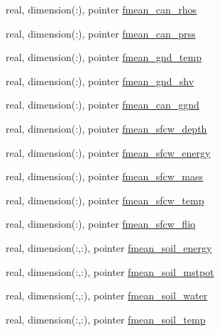 \begin{DoxyCompactItemize}
\item 
real, dimension(\+:), pointer \hyperlink{structed__state__vars_1_1sitetype_a133fcb8bbce4b0f845ba1731530c3083}{fmean\+\_\+can\+\_\+rhos}
\item 
real, dimension(\+:), pointer \hyperlink{structed__state__vars_1_1sitetype_ae1fd1be4d5db52eed0e9ccb9f2f5f03d}{fmean\+\_\+can\+\_\+prss}
\item 
real, dimension(\+:), pointer \hyperlink{structed__state__vars_1_1sitetype_a0edf09585748a9cac92aadeac17fe8c7}{fmean\+\_\+gnd\+\_\+temp}
\item 
real, dimension(\+:), pointer \hyperlink{structed__state__vars_1_1sitetype_ac4638175b3f7499b39d2fd6781d524d4}{fmean\+\_\+gnd\+\_\+shv}
\item 
real, dimension(\+:), pointer \hyperlink{structed__state__vars_1_1sitetype_ac22262ffe3410adfedbf9d40f9b4be97}{fmean\+\_\+can\+\_\+ggnd}
\item 
real, dimension(\+:), pointer \hyperlink{structed__state__vars_1_1sitetype_a786880ccfc5be46ae359b69f4bd44a91}{fmean\+\_\+sfcw\+\_\+depth}
\item 
real, dimension(\+:), pointer \hyperlink{structed__state__vars_1_1sitetype_ad2929e576b3cb23296c778dccae1b62c}{fmean\+\_\+sfcw\+\_\+energy}
\item 
real, dimension(\+:), pointer \hyperlink{structed__state__vars_1_1sitetype_a0316dfe6dc58ff705d786058c0e0de6d}{fmean\+\_\+sfcw\+\_\+mass}
\item 
real, dimension(\+:), pointer \hyperlink{structed__state__vars_1_1sitetype_aacbadeed5cc0f5fa77f4eca6c98ffeb9}{fmean\+\_\+sfcw\+\_\+temp}
\item 
real, dimension(\+:), pointer \hyperlink{structed__state__vars_1_1sitetype_ae4c8c88bb9cb7e62cdd5912fe125b931}{fmean\+\_\+sfcw\+\_\+fliq}
\item 
real, dimension(\+:,\+:), pointer \hyperlink{structed__state__vars_1_1sitetype_a3fe818c25e6a9978d05b22ee89b882d5}{fmean\+\_\+soil\+\_\+energy}
\item 
real, dimension(\+:,\+:), pointer \hyperlink{structed__state__vars_1_1sitetype_acc796b365ebedaa595bcd32827ad7d9e}{fmean\+\_\+soil\+\_\+mstpot}
\item 
real, dimension(\+:,\+:), pointer \hyperlink{structed__state__vars_1_1sitetype_a3944f8fc535d45d664a438a8f90d456f}{fmean\+\_\+soil\+\_\+water}
\item 
real, dimension(\+:,\+:), pointer \hyperlink{structed__state__vars_1_1sitetype_ae61df1cfa3d865786979b480d1760166}{fmean\+\_\+soil\+\_\+temp}
\item 

\end{DoxyCompactItemize}
